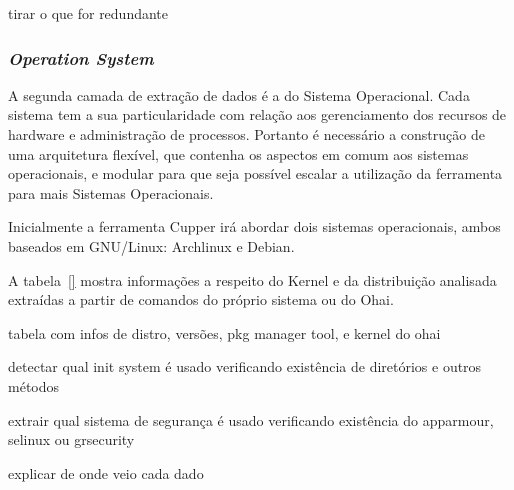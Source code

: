 {\color{red} tirar o que for redundante}


\subsubsection{\textit{Operation System}}
\label{sec:cam-os}

A segunda camada de extração de dados é a do Sistema Operacional. 
Cada sistema tem a sua particularidade com relação aos gerenciamento dos 
recursos de hardware e administração de processos. Portanto é necessário a 
construção de uma arquitetura flexível, que contenha os aspectos em comum aos
sistemas operacionais, e modular para que seja possível escalar a utilização 
da ferramenta para mais Sistemas Operacionais.

Inicialmente a ferramenta Cupper irá abordar dois sistemas operacionais, 
ambos baseados em GNU/Linux: Archlinux e Debian.

A tabela~\ref{} mostra informações a respeito do Kernel e da distribuição
analisada extraídas a partir de comandos do próprio sistema ou do Ohai.


{\color{red} tabela com infos de distro, versões, pkg manager tool, e kernel do ohai}

{\color{red} detectar qual init system é usado verificando existência de diretórios
e outros métodos}

{\color{red} extrair qual sistema de segurança é usado verificando existência
do apparmour, selinux ou grsecurity}

{\color{red} explicar de onde veio cada dado}


